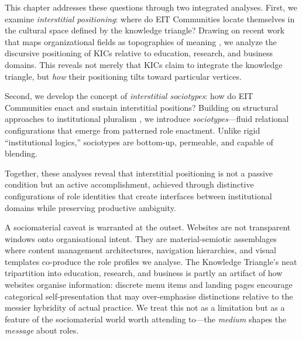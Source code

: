 \documentclass[../main.tex]{subfiles}
\begin{document}
This chapter addresses these questions through two integrated analyses. First, we examine \textit{interstitial positioning}: where do EIT Communities locate themselves in the cultural space defined by the knowledge triangle? Drawing on recent work that maps organizational fields as topographies of meaning \cite{oberg2017culture,korff2015social}, we analyze the discursive positioning of KICs relative to education, research, and business domains. This reveals not merely that KICs claim to integrate the knowledge triangle, but \textit{how} their positioning tilts toward particular vertices.

Second, we develop the concept of \textit{interstitial sociotypes}: how do EIT Communities enact and sustain interstitial positions? Building on structural approaches to institutional pluralism \cite{jancsary2017structural}, we introduce \textit{sociotypes}---fluid relational configurations that emerge from patterned role enactment. Unlike rigid ``institutional logics,'' sociotypes are bottom-up, permeable, and capable of blending.

Together, these analyses reveal that interstitial positioning is not a passive condition but an active accomplishment, achieved through distinctive configurations of role identities that create interfaces between institutional domains while preserving productive ambiguity.

A sociomaterial caveat is warranted at the outset. Websites are not transparent windows onto organisational intent. They are material-semiotic assemblages where content management architectures, navigation hierarchies, and visual templates co-produce the role profiles we analyse. The Knowledge Triangle's neat tripartition into education, research, and business is partly an artifact of how websites organise information: discrete menu items and landing pages encourage categorical self-presentation that may over-emphasise distinctions relative to the messier hybridity of actual practice. We treat this not as a limitation but as a feature of the sociomaterial world worth attending to---the \emph{medium} shapes the \emph{message} about roles.
\end{document}
